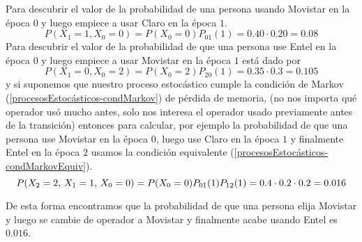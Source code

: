 \begin{Ejm}
    Para descubrir el valor de la probabilidad de una persona usando Movistar en la época $0$ y luego empiece a usar Claro en la época $1$. 
    $$P(X_1=1 , X_0=0) = P(X_0=0)P_{01}(1)= 0.40\cdot 0.20 =0.08$$
    Para descubrir el valor de la probabilidad de que una persona use Entel en la época $0$ y luego empiece a usar Movistar en la época $1$ está dado por
    $$P(X_1=0 , X_0=2) = P(X_0=2)P_{20}(1)=0.35\cdot 0.3 =0.105$$
    y si suponemos que nuestro proceso estocástico cumple la condición de Markov (\ref{procesosEstocásticos-condMarkov}) de pérdida de memoria, (no nos importa qu\'e operador us\'o  mucho antes, solo nos interesa el operador usado previamente antes de la transición) entonces para calcular, por ejemplo la probabilidad de que una persona use Movistar en la época $0$, luego use Claro en la época $1$ y finalmente Entel en la época $2$ usamos la condición equivalente (\ref{procesosEstocásticos-condMarkovEquiv}).
    $$P(X_2=2,\thinspace X_1=1,\thinspace X_0=0)=P(X_0=0)P_{01}(1)P_{12}(1)=0.4\cdot 0.2\cdot 0.2=0.016$$
    \end{Ejm}
    De esta forma encontramos que la probabilidad de que una persona elija Movistar y luego se cambie de operador a Movistar y finalmente acabe usando Entel es $0.016$.
\begin{comment}
    \begin{Teo}(Ecuación de Chapman-Kolmogorov)
        Para cualquier
        par de números enteros $m$ y $n$ tales que $0\leq m\leq n$, y para cualesquiera estados $i$ y $j$ se cumple
        \begin{eqnarray}
            p_{i,j}(m,n)=\sum_k p_{i,k}(m,u)P(u,t)
        \end{eqnarray}
    \end{Teo}
\end{comment}
